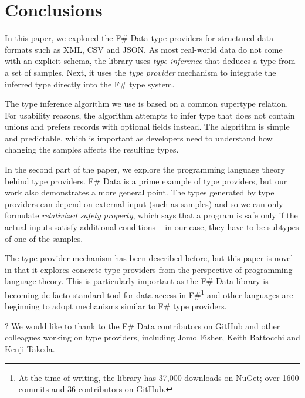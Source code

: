 \documentclass[10pt,preprint,clearpagebib]{sigplanconf}
\begin{document}
\section{Conclusions}
\label{sec:conclusions}

In this paper, we explored the F\# Data type providers for structured data formats such as XML, CSV and JSON.
As most real-world data do not come with an explicit schema, the library uses \emph{type inference} that
deduces a type from a set of samples. Next, it uses the \emph{type provider} mechanism to integrate the 
inferred type directly into the F\# type system.

The type inference algorithm we use is based on a common supertype relation. For usability reasons, the
algorithm attempts to infer type that does not contain unions and prefers records with optional fields instead.
The algorithm is simple and predictable, which is important as developers need to understand how changing the
samples affects the resulting types.

In the second part of the paper, we explore the programming language theory behind type providers. F\# Data
is a prime example of type providers, but our work also demonstrates a more general point. The types generated
by type providers can depend on external input (such as samples) and so we can only formulate \emph{relativized
safety property}, which says that a program is safe only if the actual inputs satisfy additional conditions --
in our case, they have to be subtypes of one of the samples.

The type provider mechanism has been described before, but this paper is novel in that it explores concrete
type providers from the perspective of programming language theory. This is particularly important as the
F\# Data library is becoming de-facto standard tool for data access in F\#\footnote{At the time of writing, 
the library has 37,000 downloads on NuGet; over 1600 commits and 36 contributors on GitHub.} and other 
languages are beginning to adopt mechanisms similar to F\# type providers.

\acks
?
We would like to thank to the F\# Data contributors on GitHub and other colleagues working on type providers,
including Jomo Fisher, Keith Battocchi and Kenji Takeda.



\end{document}
